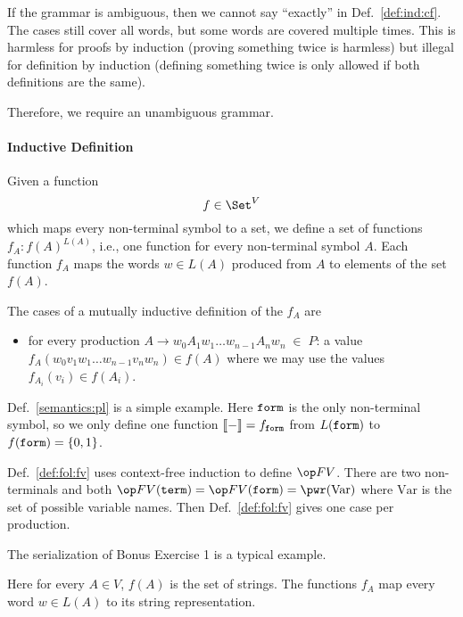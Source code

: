 \begin{remark}
If the grammar is ambiguous, then we cannot say ``exactly'' in Def.~\ref{def:ind:cf}.
The cases still cover all words, but some words are covered multiple times.
This is harmless for proofs by induction (proving something twice is harmless) but illegal for definition by induction (defining something twice is only allowed if both definitions are the same).

Therefore, we require an unambiguous grammar.
\end{remark}

\paragraph{Inductive Definition}
Given a function
  \[f\in\Set^V\]
which maps every non-terminal symbol to a set, we define
a set of functions $f_A:f(A)^{L(A)}$, i.e., one function for every non-terminal symbol $A$.
Each function $f_A$ maps the words $w\in L(A)$ produced from $A$ to elements of the set $f(A)$.

The cases of a mutually inductive definition of the $f_A$ are
 \begin{itemize}
  \item for every production $A\to w_0A_1w_1\ldots w_{n-1}A_n w_n \;\in\;P$: a value
     $f_A(w_0 v_1 w_1 \ldots w_{n-1} v_n w_n)\in f(A)$ where we may use the values $f_{A_i}(v_i)\in f(A_i)$.
 \end{itemize}

\begin{example}
Def.~\ref{semantics:pl} is a simple example.
Here $\mathtt{form}$ is the only non-terminal symbol, so we only define one function $\llbracket -\rrbracket=f_{\mathtt{form}}$ from $L(\mathtt{form})$ to $f(\mathtt{form})=\{0,1\}$.
\end{example}

\begin{example}
Def.~\ref{def:fol:fv} uses context-free induction to define $\FV$.
There are two non-terminals and both $\FV(\TERM)=\FV(\FORM)=\pwr(\mathrm{Var})$ where $\mathrm{Var}$ is the set of possible variable names.
Then Def.~\ref{def:fol:fv} gives one case per production.
\end{example}

\begin{example}[Serialization]
The serialization of Bonus Exercise 1 is a typical example.

Here for every $A\in V$, $f(A)$ is the set of strings.
The functions $f_A$ map every word $w\in L(A)$ to its string representation.
\end{example}

